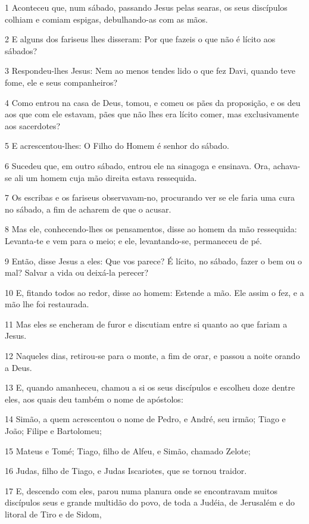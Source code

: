 \par 1 Aconteceu que, num sábado, passando Jesus pelas searas, os seus discípulos colhiam e comiam espigas, debulhando-as com as mãos.
\par 2 E alguns dos fariseus lhes disseram: Por que fazeis o que não é lícito aos sábados?
\par 3 Respondeu-lhes Jesus: Nem ao menos tendes lido o que fez Davi, quando teve fome, ele e seus companheiros?
\par 4 Como entrou na casa de Deus, tomou, e comeu os pães da proposição, e os deu aos que com ele estavam, pães que não lhes era lícito comer, mas exclusivamente aos sacerdotes?
\par 5 E acrescentou-lhes: O Filho do Homem é senhor do sábado.
\par 6 Sucedeu que, em outro sábado, entrou ele na sinagoga e ensinava. Ora, achava-se ali um homem cuja mão direita estava ressequida.
\par 7 Os escribas e os fariseus observavam-no, procurando ver se ele faria uma cura no sábado, a fim de acharem de que o acusar.
\par 8 Mas ele, conhecendo-lhes os pensamentos, disse ao homem da mão ressequida: Levanta-te e vem para o meio; e ele, levantando-se, permaneceu de pé.
\par 9 Então, disse Jesus a eles: Que vos parece? É lícito, no sábado, fazer o bem ou o mal? Salvar a vida ou deixá-la perecer?
\par 10 E, fitando todos ao redor, disse ao homem: Estende a mão. Ele assim o fez, e a mão lhe foi restaurada.
\par 11 Mas eles se encheram de furor e discutiam entre si quanto ao que fariam a Jesus.
\par 12 Naqueles dias, retirou-se para o monte, a fim de orar, e passou a noite orando a Deus.
\par 13 E, quando amanheceu, chamou a si os seus discípulos e escolheu doze dentre eles, aos quais deu também o nome de apóstolos:
\par 14 Simão, a quem acrescentou o nome de Pedro, e André, seu irmão; Tiago e João; Filipe e Bartolomeu;
\par 15 Mateus e Tomé; Tiago, filho de Alfeu, e Simão, chamado Zelote;
\par 16 Judas, filho de Tiago, e Judas Iscariotes, que se tornou traidor.
\par 17 E, descendo com eles, parou numa planura onde se encontravam muitos discípulos seus e grande multidão do povo, de toda a Judéia, de Jerusalém e do litoral de Tiro e de Sidom,
